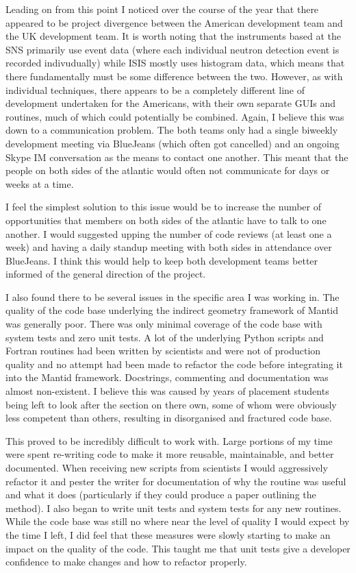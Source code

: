 \documentclass[paper=a4, fontsize=11pt]{scrartcl}	%
\numberwithin{equation}{section}															%
\numberwithin{figure}{section}																%
\numberwithin{table}{section}
\begin{document}
Leading on from this point I noticed over the course of the year that
there appeared to be project divergence between the American development
team and the UK development team. It is worth noting that the
instruments based at the SNS primarily use event data (where each
individual neutron detection event is recorded indivudually) while ISIS
mostly uses histogram data, which means that there fundamentally must be
some difference between the two. However, as with individual techniques,
there appears to be a completely different line of development
undertaken for the Americans, with their own separate GUIs and routines,
much of which could potentially be combined. Again, I believe this was
down to a communication problem. The both teams only had a single
biweekly development meeting via BlueJeans (which often got cancelled)
and an ongoing Skype IM conversation as the means to contact one
another. This meant that the people on both sides of the atlantic would
often not communicate for days or weeks at a time.

I feel the simplest solution to this issue would be to increase the
number of opportunities that members on both sides of the atlantic have
to talk to one another. I would suggested upping the number of code
reviews (at least one a week) and having a daily standup meeting with
both sides in attendance over BlueJeans. I think this would help to keep
both development teams better informed of the general direction of the
project.

I also found there to be several issues in the specific area I was
working in. The quality of the code base underlying the indirect
geometry framework of Mantid was generally poor. There was only minimal
coverage of the code base with system tests and zero unit tests. A lot
of the underlying Python scripts and Fortran routines had been written
by scientists and were not of production quality and no attempt had been
made to refactor the code before integrating it into the Mantid
framework. Docstrings, commenting and documentation was almost
non-existent. I believe this was caused by years of placement students being left to look after the section on there own, some of whom were obviously less competent than others, resulting in disorganised and fractured code base.

This proved to be incredibly difficult to work with. Large portions of
my time were spent re-writing code to make it more reusable,
maintainable, and better documented. When receiving new scripts from
scientists I would aggressively refactor it and pester the writer for
documentation of why the routine was useful and what it does
(particularly if they could produce a paper outlining the method). I
also began to write unit tests and system tests for any new routines.
While the code base was still no where near the level of quality I would
expect by the time I left, I did feel that these measures were slowly
starting to make an impact on the quality of the code. This taught me that unit tests give a developer confidence to make changes and how to refactor properly. 
\end{document}
